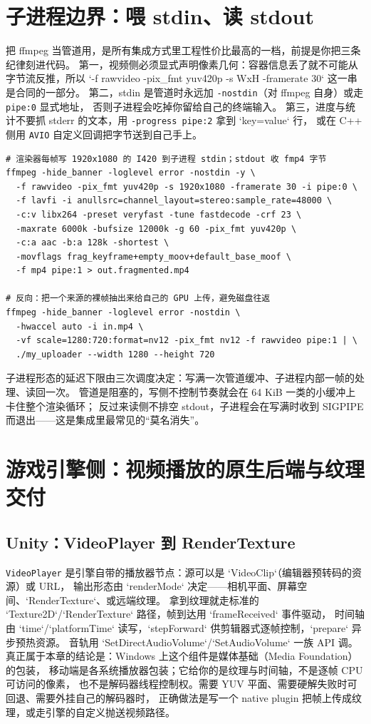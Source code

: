 \documentclass[12pt,a4paper,fontset=fandol]{ctexbook}
\newcommand{\Tp}[1]{\texttt{#1}}
\newcommand{\Bk}{\discretionary{}{}{}}
\begin{document}
\section{子进程边界：喂 stdin、读 stdout}

把 ffmpeg 当管道用，是所有集成方式里工程性价比最高的一档，前提是你把三条纪律刻进代码。
第一，视频侧必须显式声明像素几何：容器信息丢了就不可能从字节流反推，所以
`-f rawvideo -pix\_fmt yuv420p -s WxH -framerate 30` 这一串是合同的一部分。
第二，stdin 是管道时永远加 \Tp{-{\Bk}nostdin}（对 ffmpeg 自身）或走 \Tp{pipe:0} 显式地址，
否则子进程会吃掉你留给自己的终端输入。
第三，进度与统计不要抓 stderr 的文本，用 \Tp{-{\Bk}progre{\Bk}ss pipe:2} 拿到 `key=value` 行，
或在 C++ 侧用 \Tp{AVIO} 自定义回调把字节送到自己手上。

\begin{lstlisting}[style=shellstyle,caption={子进程管道：stdin 收 rawvideo，stdout 出 fragmented MP4},label={lst:ch13-pipe}]
# 渲染器每帧写 1920x1080 的 I420 到子进程 stdin；stdout 收 fmp4 字节
ffmpeg -hide_banner -loglevel error -nostdin -y \
  -f rawvideo -pix_fmt yuv420p -s 1920x1080 -framerate 30 -i pipe:0 \
  -f lavfi -i anullsrc=channel_layout=stereo:sample_rate=48000 \
  -c:v libx264 -preset veryfast -tune fastdecode -crf 23 \
  -maxrate 6000k -bufsize 12000k -g 60 -pix_fmt yuv420p \
  -c:a aac -b:a 128k -shortest \
  -movflags frag_keyframe+empty_moov+default_base_moof \
  -f mp4 pipe:1 > out.fragmented.mp4

# 反向：把一个来源的裸帧抽出来给自己的 GPU 上传，避免磁盘往返
ffmpeg -hide_banner -loglevel error -nostdin \
  -hwaccel auto -i in.mp4 \
  -vf scale=1280:720:format=nv12 -pix_fmt nv12 -f rawvideo pipe:1 | \
  ./my_uploader --width 1280 --height 720
\end{lstlisting}

子进程形态的延迟下限由三次调度决定：写满一次管道缓冲、子进程内部一帧的处理、读回一次。
管道是阻塞的，写侧不控制节奏就会在 64 KiB 一类的小缓冲上卡住整个渲染循环；
反过来读侧不排空 stdout，子进程会在写满时收到 SIGPIPE 而退出——这是集成里最常见的``莫名消失''。

\section{游戏引擎侧：视频播放的原生后端与纹理交付}

\subsection*{Unity：VideoPlayer 到 RenderTexture}
\Tp{VideoPla{\Bk}yer} 是引擎自带的播放器节点：源可以是 `VideoClip`（编辑器预转码的资源）或 URL，
输出形态由 `renderMode` 决定——相机平面、屏幕空间、`RenderTexture`、或远端纹理。
拿到纹理就走标准的 `Texture2D`/`RenderTexture` 路径，帧到达用 `frameReceived` 事件驱动，
时间轴由 `time`/`platformTime` 读写，`stepForward` 供剪辑器式逐帧控制，`prepare` 异步预热资源。
音轨用 `SetDirectAudioVolume`/`SetAudioVolume` 一族 API 调。
真正属于本章的结论是：Windows 上这个组件是媒体基础（Media Foundation）的包装，
移动端是各系统播放器包装；它给你的是纹理与时间轴，不是逐帧 CPU 可访问的像素，
也不是解码器线程控制权。需要 YUV 平面、需要硬解失败时可回退、需要外挂自己的解码器时，
正确做法是写一个 native plugin 把帧上传成纹理，或走引擎的自定义抛送视频路径。
\end{document}
